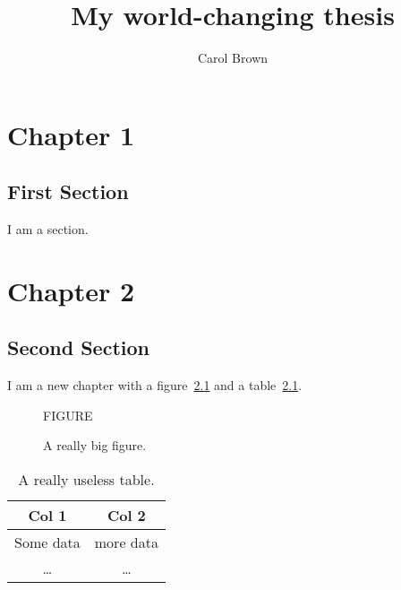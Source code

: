\documentclass[doubleheaders,los,lof,lot,titlepage,oneside,openright,11pt]{epflthesis}
\author{Carol Brown}
\title{My world-changing thesis}
\numberwithin{equation}{chapter}
\begin{document}
\chapter{Chapter 1}
\section{First Section}
I am a section.

\chapter{Chapter 2}
\section{Second Section}
I am a new chapter with a figure~\ref{fig:myfig} and a table~\ref{tab:mytab}.

\begin{figure}
  \centering
  \huge FIGURE
  \caption{A really big figure.}
  \label{fig:myfig}
\end{figure}

\begin{table}
  \begin{center}
    \begin{tabular}{cc}
      \toprule
      Col 1 & Col 2 \\
      \midrule
      Some data & more data \\
      \ldots & \ldots \\
      \bottomrule
    \end{tabular}
    \caption{A really useless table.}
    \label{tab:mytab}
  \end{center}
\end{table}
\end{document}
